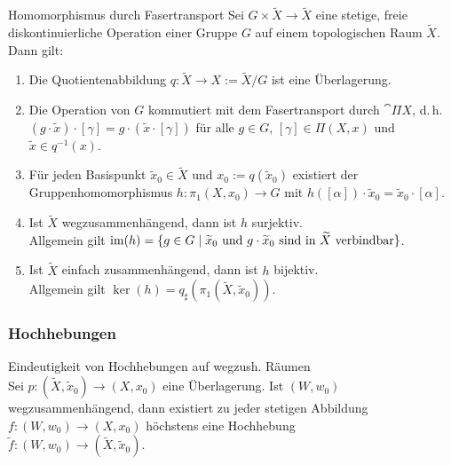 \begin{Satz}{Homomorphismus durch Fasertransport}
    Sei $G \times \widetilde{X} \rightarrow \widetilde{X}$ eine stetige, freie
    diskontinuierliche Operation einer Gruppe $G$ auf einem topologischen Raum
    $\widetilde{X}$. Dann gilt:
    \begin{enumerate}
        \item
        Die Quotientenabbildung
        $q\colon \widetilde{X} \rightarrow X := \widetilde{X}/G$
        ist eine Überlagerung.
        
        \item
        Die Operation von $G$ kommutiert mit dem Fasertransport durch
        $\cat{\Pi X}$, d.\,h. \\
        $(g \cdot \widetilde{x}) \cdot [\gamma] =
        g \cdot (\widetilde{x} \cdot [\gamma])$
        für alle $g \in G$, $[\gamma] \in \Pi(X, x)$ und
        $\widetilde{x} \in q^{-1}(x)$.
        
        \item
        Für jeden Basispunkt $\widetilde{x}_0 \in \widetilde{X}$ und
        $x_0 := q(\widetilde{x}_0)$ existiert der Gruppenhomomorphismus
        $h\colon \pi_1(X, x_0) \rightarrow G$ mit
        $h([\alpha]) \cdot \widetilde{x}_0 = \widetilde{x}_0 \cdot [\alpha]$.
        
        \item
        Ist $\widetilde{X}$ wegzusammenhängend, dann ist $h$ surjektiv. \\
        Allgemein gilt $\text{im}(h) = \{g \in G \;|\; \widetilde{x}_0 \text{ und }
        g \cdot \widetilde{x}_0 \text{ sind in } \widetilde{X}
        \text{ verbindbar}\}$.
        
        \item
        Ist $\widetilde{X}$ einfach zusammenhängend, dann ist $h$ bijektiv. \\
        Allgemein gilt
        $\ker(h) = q_\sharp(\pi_1(\widetilde{X}, \widetilde{x}_0))$.
    \end{enumerate}
\end{Satz}

\pagebreak

\subsubsection{%
    Hochhebungen%
}

\begin{Satz}{Eindeutigkeit von Hochhebungen auf wegzush. Räumen}\\
    Sei $p\colon (\widetilde{X}, \widetilde{x}_0) \rightarrow (X, x_0)$
    eine Überlagerung.
    Ist $(W, w_0)$ wegzusammenhängend, dann existiert zu jeder stetigen
    Abbildung $f\colon (W, w_0) \rightarrow (X, x_0)$
    höchstens eine Hochhebung \\
    $\widetilde{f}\colon (W, w_0) \rightarrow
    (\widetilde{X}, \widetilde{x}_0)$.
\end{Satz}

